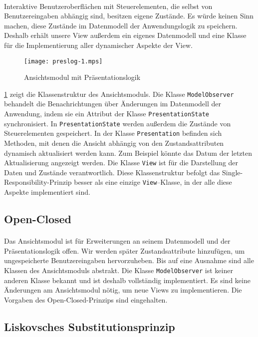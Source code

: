 \documentclass{article}
\begin{document}
\paragraph{}
Interaktive Benutzeroberflächen mit Steuerelementen, die selbst von Benutzereingaben abhängig sind, besitzen eigene Zustände. Es würde keinen Sinn machen, diese Zustände im Datenmodell der Anwendungslogik zu speichern. Deshalb erhält unsere View außerdem ein eigenes Datenmodell und eine Klasse für die Implementierung aller dynamischer Aspekte der View.
\begin{figure}[h]
  \centering
  \texttt{[image: preslog-1.mps]}
  \caption{Ansichtsmodul mit Präsentationslogik}
  \label{preslog}
\end{figure}
\ref{preslog} zeigt die Klassenstruktur des Ansichtsmoduls. Die Klasse \texttt{ModelObserver} behandelt die Benachrichtungen über Änderungen im Datenmodell der Anwendung, indem sie ein Attribut der Klasse \texttt{PresentationState} synchronisiert. In \texttt{PresentationState} werden außerdem die Zustände von Steuerelementen gespeichert. In der Klasse \texttt{Presentation} befinden sich Methoden, mit denen die Ansicht abhängig von den Zustandsattributen dynamisch aktualisiert werden kann. Zum Beispiel könnte das Datum der letzten Aktualisierung angezeigt werden. Die Klasse \texttt{View} ist für die Darstellung der Daten und Zustände verantwortlich. Diese Klassenstruktur befolgt das Single-Responsibility-Prinzip besser als eine einzige \texttt{View}--Klasse, in der alle diese Aspekte implementiert sind.

\subsection{Open-Closed}
\paragraph{}
Das Ansichtsmodul ist für Erweiterungen an seinem Datenmodell und der Präsentationslogik offen. Wir werden später Zustandsattribute hinzufügen, um ungespeicherte Benutzereingaben hervorzuheben. Bis auf eine Ausnahme sind alle Klassen des Ansichtsmoduls abstrakt. Die Klasse \texttt{ModelObserver} ist keiner anderen Klasse bekannt und ist deshalb vollständig implementiert. Es sind keine Änderungen am Ansichtsmodul nötig, um neue Views zu implementieren. Die Vorgaben des Open-Closed-Prinzips sind eingehalten.

\subsection{Liskovsches Substitutionsprinzip}
\end{document}
